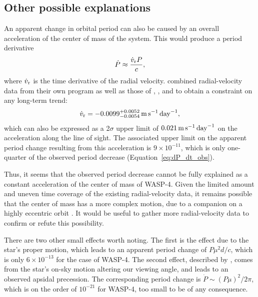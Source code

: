 \documentclass[12pt,twocolumn,tighten]{aastex62}
\begin{document}
\subsection{Other possible explanations}

An apparent change in orbital period can also be caused by an overall
acceleration of the center of mass of the system.  This would produce
a period derivative
\begin{equation}
	\dot{P} \approx \frac{\dot{v}_{\rm r} P}{c},
\end{equation}
where $\dot{v}_{\rm r}$ is the time derivative of the radial velocity.
\citet{knutson_friends_2014} combined radial-velocity data from their
own program as well as those of \citet{wilson_wasp-4b_2008},
\citet{pont_determining_2011}, and \citet{husnoo_observational_2012}
to obtain a constraint on any long-term trend:
\begin{equation}
\dot{v}_{\rm r} =
   -0.0099^{+0.0052}_{-0.0054}
   \,{\rm m}\,{\rm s}^{-1}\,{\rm day}^{-1},
\end{equation}
which can also be expressed as a 2$\sigma$ upper limit of $0.021
\,{\rm m}\,{\rm s}^{-1}\,{\rm day}^{-1}$ on the acceleration along the
line of sight.  The associated upper limit on the apparent period
change resulting from this acceleration is $9\times 10^{-11}$, which
is only one-quarter of the observed period decrease
(Equation~\ref{eq:dP_dt_obs}).

Thus, it seems that the observed period decrease cannot be fully
explained as a constant acceleration of the center of mass of WASP-4.
Given the limited amount and uneven time coverage of the existing
radial-velocity data, it remains possible that the center of mass has
a more complex motion, due to a companion on a highly eccentric orbit
\citep[similar to {\it e.g.}, WASP-53 or WASP-81][]{triaud_peculiar_2017}.
It would be useful to gather more radial-velocity data to confirm or
refute this possibility.

There are two other small effects worth noting.  The first is the
\citet{shklovskii_possible_1970} effect due to the star's proper
motion, which leads to an apparent period change of $P\mu^2 d/ c$,
which is only $6\times10^{-13}$ for the case of WASP-4.  The second
effect, described by \citet{rafikov_stellar_2009}, comes from the
star's on-sky motion altering our viewing angle, and leads to an
observed apsidal precession. The corresponding period change is
$\dot{P} \sim (P\mu)^2/2\pi$, which is on the order of $10^{-21}$ for
WASP-4, too small to be of any consequence.
\end{document}
